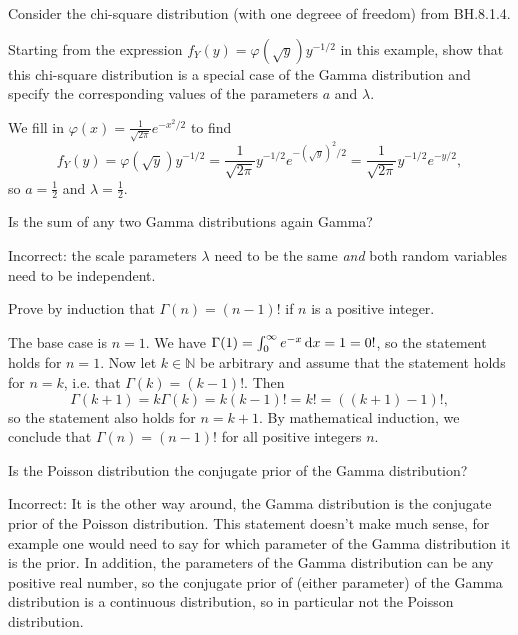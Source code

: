 \begin{exercise}
Consider the chi-square distribution (with one degreee of freedom) from BH.8.1.4.

Starting from the expression $f_Y(y) = \varphi \left(\sqrt{y}\right) y^{-1/2}$ in this example, show that this  chi-square distribution is a special case of the Gamma distribution and specify the corresponding values of the parameters $a$ and $\lambda$.

\begin{solution} We fill in $\varphi(x) = \frac{1}{\sqrt{2\pi}} e^{-x^2/2}$ to find
\begin{equation*} f_Y(y) = \varphi \left(\sqrt{y}\right) y^{-1/2} = \frac{1}{\sqrt{2\pi}} y^{-1/2} e^{-(\sqrt{y})^2/2} = \frac{1}{\sqrt{2\pi}} y^{-1/2} e^{-y/2}, \end{equation*} so $a = \tfrac12$ and $\lambda = \tfrac12$.
\end{solution}
\end{exercise}

\begin{exercise}
Is the sum of any two Gamma distributions again Gamma?
\begin{solution}
Incorrect: the scale parameters $\lambda$ need to be the same \emph{and} both random variables need to be independent.
\end{solution}
\end{exercise}

\begin{exercise}
Prove by induction that $\Gamma(n)=(n-1)!$ if $n$ is a positive integer.

\begin{solution}
The base case is $n=1$. We have $\Gamma(1) = \int_0^\infty e^{-x} \,\textrm{d}x = 1 = 0!$, so the statement holds for $n=1$. Now let $k \in \mathbb N$ be arbitrary and assume that the statement holds for $n=k$, i.e. that $\Gamma(k) = (k-1)!$. Then \begin{equation}\Gamma(k+1) = k\Gamma(k) = k (k-1)! = k! = ((k+1)-1)!,
\end{equation}
so the statement also holds for $n=k+1$. By mathematical induction, we conclude that  $\Gamma(n)=(n-1)!$ for all positive integers $n$.
\end{solution}
\end{exercise}

\begin{exercise}
Is the Poisson distribution  the conjugate prior of the Gamma distribution?
\begin{solution}
Incorrect: It is the other way around, the Gamma distribution is the conjugate prior of the Poisson distribution. This statement doesn't make much sense, for example one would need to say for which parameter of the Gamma distribution it is the prior. In addition, the parameters of the Gamma distribution can be any positive real number, so the conjugate prior of (either parameter) of the Gamma distribution is a continuous distribution, so in particular not the Poisson distribution.
\end{solution}
\end{exercise}

